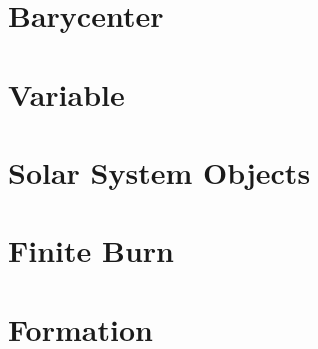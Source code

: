 \section{Barycenter}


\section{Variable}


\section{Solar System Objects}


















\section{Finite Burn}


\section{Formation}


